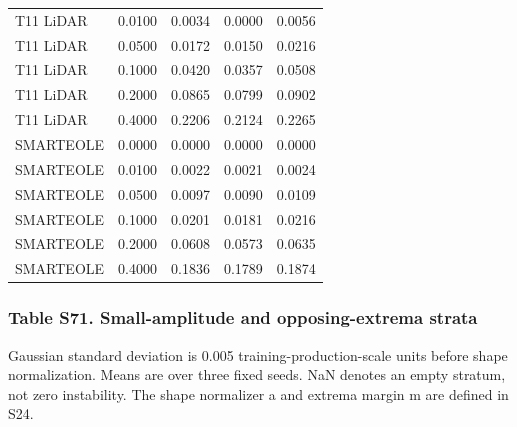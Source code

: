 \documentclass[a4paper,11pt]{article}
\begin{document}
{\begin{longtable}[]{@{}lllll@{}}
T11 LiDAR & 0.0100 & 0.0034 & 0.0000 & 0.0056 \\
T11 LiDAR & 0.0500 & 0.0172 & 0.0150 & 0.0216 \\
T11 LiDAR & 0.1000 & 0.0420 & 0.0357 & 0.0508 \\
T11 LiDAR & 0.2000 & 0.0865 & 0.0799 & 0.0902 \\
T11 LiDAR & 0.4000 & 0.2206 & 0.2124 & 0.2265 \\
SMARTEOLE & 0.0000 & 0.0000 & 0.0000 & 0.0000 \\
SMARTEOLE & 0.0100 & 0.0022 & 0.0021 & 0.0024 \\
SMARTEOLE & 0.0500 & 0.0097 & 0.0090 & 0.0109 \\
SMARTEOLE & 0.1000 & 0.0201 & 0.0181 & 0.0216 \\
SMARTEOLE & 0.2000 & 0.0608 & 0.0573 & 0.0635 \\
SMARTEOLE & 0.4000 & 0.1836 & 0.1789 & 0.1874 \\
\end{longtable}
}

\subsubsection{Table S71. Small-amplitude and opposing-extrema strata}\label{table-s71.-small-amplitude-and-opposing-extrema-strata}

Gaussian standard deviation is 0.005 training-production-scale units before shape normalization. Means are over three fixed seeds. NaN denotes an empty stratum, not zero instability. The shape normalizer a and extrema margin m are defined in S24.
\end{document}
